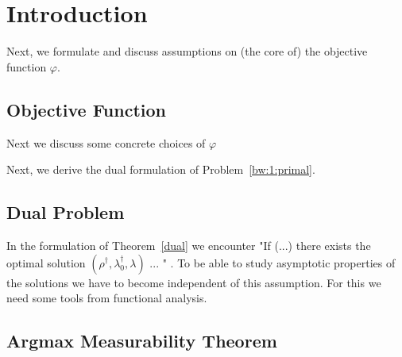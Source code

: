 \section{Introduction}




Next, we formulate and discuss assumptions on (the core of) the objective function $\varphi$.
\subsection{Objective Function}


Next we discuss some concrete choices of $\varphi$




Next, we derive the dual formulation of Problem~\ref{bw:1:primal}.
\subsection{Dual Problem}



In the formulation of Theorem~\ref{dual} we encounter "If (...) there exists the optimal solution $(\rho^\dagger,\lambda_0^\dagger,\lambda)$ ... " .
To be able to study asymptotic properties of the solutions we have to become independent of this assumption.
For this we need some tools from functional analysis.
\subsection{Argmax Measurability Theorem}


%

%
